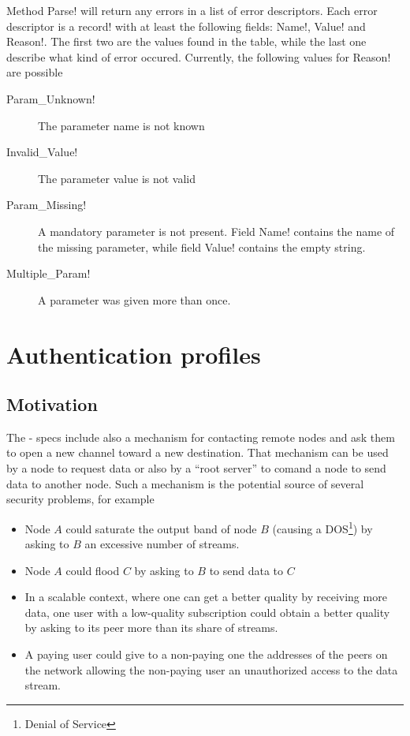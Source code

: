 \documentclass[a4paper]{medusabook}
\begin{document}
\begin{description}
  Method \ttt Parse! will return any errors in a list of error
  descriptors.  Each error descriptor is a \ttt record! with at least
  the following fields: \ttt Name!, \ttt Value! and \ttt Reason!.  The
  first two are the values found in the table, while the last one
  describe what kind of error occured.  Currently, the following
  values for \ttt Reason! are possible
  \begin{description}
  \item[\ttt Param\_Unknown!] The parameter name is not known
  \item[\ttt Invalid\_Value!] The parameter value is not valid
  \item[\ttt Param\_Missing!] A mandatory parameter is not present.
  Field \ttt Name! contains the name of the missing parameter, while
  field \ttt Value! contains the empty string.
  \item[\ttt Multiple\_Param!] A parameter was given more than once.
  \end{description}
%
\end{description}

\chapter{Authentication profiles}
\label{chap:1;overview}

\section{Motivation}
\label{sect:1.0;overview}

The \ppetp- specs include also a mechanism for contacting remote nodes
and ask them to open a new channel toward a new destination.  That
mechanism can be used by a node to request data or also by a ``root
server'' to comand a node to send data to another node.  Such a
mechanism is the potential source of several security problems, for
example 

\begin{itemize}
  \item
    Node $A$ could saturate the output band of node $B$ (causing a
    DOS\footnote{Denial of Service}) by asking to $B$ an excessive
    number of streams.
  \item
    Node $A$ could flood $C$ by asking to $B$ to send data to $C$
  \item
    In a scalable context, where one can get a better quality by
    receiving more data, one user with a low-quality subscription
    could obtain a better quality by asking to its peer more than its
    share of streams.
  \item
    A paying user could give to a non-paying one the addresses of the
    peers on the network allowing the non-paying user an unauthorized
    access to the data stream.
\end{itemize}
\end{document}
